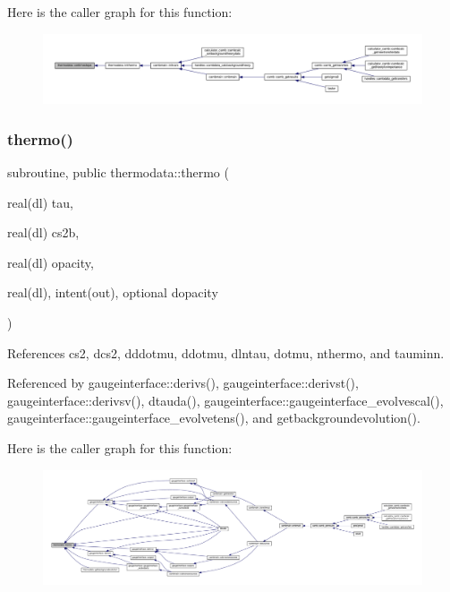 Here is the caller graph for this function\+:
\nopagebreak
\begin{figure}[H]
\begin{center}
\leavevmode
\includegraphics[width=350pt]{namespacethermodata_a53958f3aa160bfde722bffb2b9d47df8_icgraph}
\end{center}
\end{figure}
\mbox{\label{namespacethermodata_a9ff7d8c599c64921c554cbc2069b3d2b}} 
\subsubsection{\texorpdfstring{thermo()}{thermo()}}
{\footnotesize\ttfamily subroutine, public thermodata\+::thermo (\begin{DoxyParamCaption}\item[{real(dl)}]{tau,  }\item[{real(dl)}]{cs2b,  }\item[{real(dl)}]{opacity,  }\item[{real(dl), intent(out), optional}]{dopacity }\end{DoxyParamCaption})}



References cs2, dcs2, dddotmu, ddotmu, dlntau, dotmu, nthermo, and tauminn.



Referenced by gaugeinterface\+::derivs(), gaugeinterface\+::derivst(), gaugeinterface\+::derivsv(), dtauda(), gaugeinterface\+::gaugeinterface\+\_\+evolvescal(), gaugeinterface\+::gaugeinterface\+\_\+evolvetens(), and getbackgroundevolution().

Here is the caller graph for this function\+:
\nopagebreak
\begin{figure}[H]
\begin{center}
\leavevmode
\includegraphics[width=350pt]{namespacethermodata_a9ff7d8c599c64921c554cbc2069b3d2b_icgraph}
\end{center}
\end{figure}
\mbox{\label{namespacethermodata_ac4c3a9846b711f25cba7ce38322ee66b}} 
